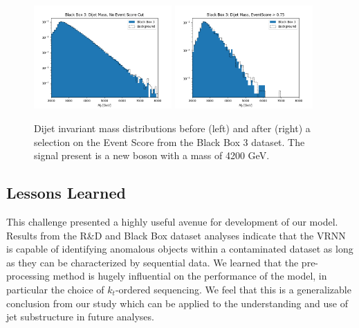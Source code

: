 \documentclass[letterpaper,11pt]{article}
\begin{document}
\begin{figure}[H]
	\begin{center}
		\includegraphics[width=0.47\textwidth]{imgs/BB3.png}
		\includegraphics[width=0.47\textwidth]{imgs/BB3_Cut.png}
	\end{center}
	\caption{Dijet invariant mass distributions before (left) and after (right) a selection on the Event Score from the Black Box 3 dataset. The signal present is a new boson with a mass of 4200 GeV.}
	\label{fig:bb3}
\end{figure}


\subsection{Lessons Learned}
\label{sec:lessons}


\hspace{\parindent}This challenge presented a highly useful avenue for development of our model. 
Results from the R\&D and Black Box dataset analyses indicate that the VRNN is capable of identifying anomalous objects within a contaminated dataset as long as they can be characterized by sequential data. 
We learned that the pre-processing method is hugely influential on the performance of the model, in particular the choice of $k_{t}$-ordered sequencing. 
We feel that this is a generalizable conclusion from our study which can be applied to the understanding and use of jet substructure in future analyses.
\end{document}
